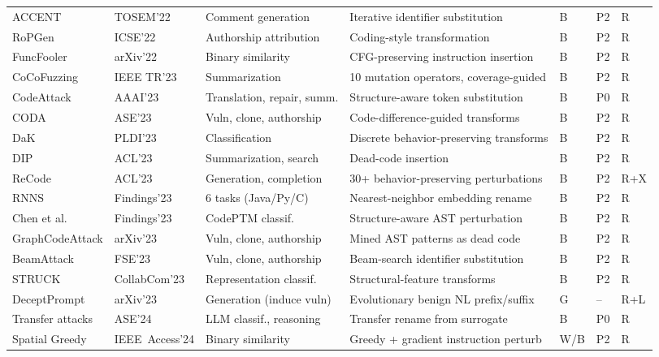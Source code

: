 \documentclass[acmsmall,screen,review]{acmart}
\begin{document}
{\begin{longtable}{@{}L{2.0cm} L{1.55cm} L{2.25cm} L{3.75cm} C{0.75cm} C{0.60cm} L{0.95cm}@{}}
ACCENT~\cite{zhou2022accent} & TOSEM'22 & Comment generation & Iterative identifier substitution & B & P2 & R \\
RoPGen~\cite{li2022ropgen} & ICSE'22 & Authorship attribution & Coding-style transformation & B & P2 & R \\
FuncFooler~\cite{funcfooler2022} & arXiv'22 & Binary similarity & CFG-preserving instruction insertion & B & P2 & R \\
CoCoFuzzing \cite{wei2022cocofuzzing} & IEEE TR'23 & Summarization & 10 mutation operators, coverage-guided & B & P2 & R \\
CodeAttack~\cite{jha2023codeattack} & AAAI'23 & Translation, repair, summ. & Structure-aware token substitution & B & P0 & R \\
CODA~\cite{tian2023coda} & ASE'23 & Vuln, clone, authorship & Code-difference-guided transforms & B & P2 & R \\
DaK~\cite{gao2023dak} & PLDI'23 & Classification & Discrete behavior-preserving transforms & B & P2 & R \\
DIP~\cite{na2023dip} & ACL'23 & Summarization, search & Dead-code insertion & B & P2 & R \\
ReCode~\cite{wang2023recode} & ACL'23 & Generation, completion & 30+ behavior-preserving perturbations & B & P2 & R+X \\
RNNS~\cite{zhang2023rnns} & Findings'23 & 6 tasks (Java/Py/C) & Nearest-neighbor embedding rename & B & P2 & R \\
Chen et al.~\cite{chen2023structure} & Findings'23 & CodePTM classif. & Structure-aware AST perturbation & B & P2 & R \\
GraphCode\allowbreak{}Attack \cite{nguyen2023graphcodeattack} & arXiv'23 & Vuln, clone, authorship & Mined AST patterns as dead code & B & P2 & R \\
BeamAttack \cite{gu2023beamattack} & FSE'23 & Vuln, clone, authorship & Beam-search identifier substitution & B & P2 & R \\
STRUCK~\cite{zhang2023struck} & CollabCom\newline'23 & Representation classif. & Structural-feature transforms & B & P2 & R \\
DeceptPrompt \cite{deceptprompt2023} & arXiv'23 & Generation (induce vuln) & Evolutionary benign NL prefix/suffix & G & -- & R+L \\
Transfer attacks~\cite{transfer2024coding} & ASE'24 & LLM classif., reasoning & Transfer rename from surrogate & B & P0 & R \\
Spatial Greedy~\cite{spatialgreedy2024} & IEEE~Access'24 & Binary similarity & Greedy + gradient instruction perturb & W/B & P2 & R \\

\end{longtable}}
\end{document}
